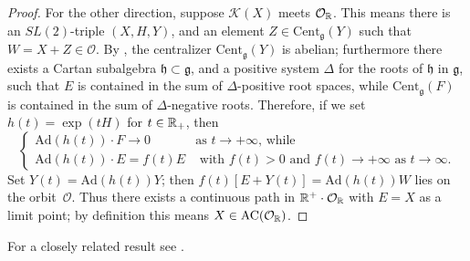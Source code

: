 \documentclass{article}
\theoremstyle{definition}
\numberwithin{equation}{section}
\renewcommand{\-}{\hyp{}}
\newcommand{\g}{\mathfrak g}
\renewcommand{\O}{\mathcal O}
\newcommand{\K}{\mathcal K}
\newcommand{\Cent}{\mathrm{Cent}}
\newcommand{\AC}{\mathrm{AC}}
\begin{document}
\begin{proof}
For the other direction, suppose $\K(X)$ meets $\mathcal O_{\mathbb{R}}$.
This means there is an $SL(2)$-triple $(X,H,Y)$, and an element $Z\in \Cent_\g(Y)$ such that $W=X+Z \in \O$. 
By \cite{Kostant59}, the centralizer  $\mathrm{Cent}_{\g}(Y)$ is abelian; furthermore there exists a Cartan subalgebra $\mathfrak{h} \subset \g$, and a positive system $\Delta$ for the roots of $\mathfrak{h}$ in $\g$, such that $E$ is contained in the sum of $\Delta$-positive root spaces, while $\mathrm{Cent}_{\g}(F)$ is contained in the sum of $\Delta$-negative roots.  Therefore, if we set $h(t) = \exp(tH)$ for $t \in \mathbb{R}_+$, then 
\[\begin{cases} \mathrm{Ad}(h(t)) \cdot F \longrightarrow 0 & \text{as $t \to +\infty$, while} \\
 \mathrm{Ad}(h(t)) \cdot E = f(t) E & \text{ with $f(t) >0$ and $f(t)\to +\infty$ as $t \to \infty$.}\end{cases}\]
Set $Y(t) = \mathrm{Ad}(h(t)) Y$; then $f(t) \left[ E + Y(t) \right] = \mathrm{Ad}(h(t)) W$ lies on the orbit~$\O$. Thus there exists a continuous path in $\R^+ \cdot \O_\R$ with $E=X$ as a limit point; by definition this means $X \in \AC(\O_\R)$.
\end{proof}

For a closely related result see \cite[Proposition 3.5]{fm}.
  
\end{document}
